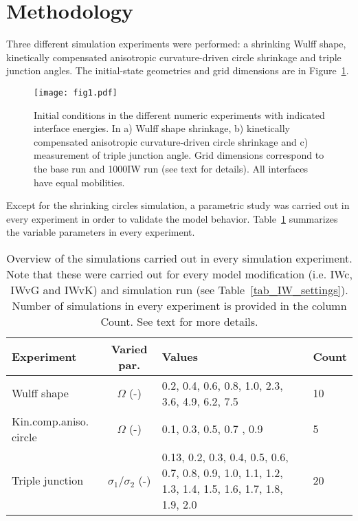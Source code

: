 \section{Methodology}
Three different simulation experiments were performed: a shrinking Wulff shape, kinetically compensated anisotropic curvature-driven circle shrinkage and triple junction angles. The initial-state geometries and grid dimensions are in Figure~\ref{fig_IC_sketch}. 
\label{sec_Numeric}
\begin{figure}[]
	\centering
	\texttt{[image: fig1.pdf]}
	\caption[PF model benchmarking, sketch - initial conditions in the different numeric experiments]{Initial conditions in the different numeric experiments with indicated interface energies. In a) Wulff shape shrinkage, b) kinetically compensated anisotropic curvature-driven circle shrinkage and c)  measurement of triple junction angle.  Grid dimensions correspond to the base run and 1000IW run (see text for details). All interfaces have equal mobilities.}
	\label{fig_IC_sketch}
\end{figure} 
Except for the shrinking circles simulation, a parametric study was carried out in every experiment in order to validate the model behavior. Table~\ref{tab_overview_simulations} summarizes the variable parameters in every experiment.
\begin{table}[]
	\centering
	\caption[PF model benchmarking - overview of the simulations carried out in every simulation experiment]{Overview of the simulations carried out in every simulation experiment. Note that these were carried out for every model modification (i.e. IWc, IWvG and IWvK) and simulation run (see Table~\ref{tab_IW_settings}). Number of simulations in every experiment is provided in the column Count. See text for more details.}
	\label{tab_overview_simulations}
	\begin{tabular}{lc|p{3.2cm}|l}
		\toprule
		Experiment          & Varied par.                   & Values                   & Count \\ \hline
		Wulff shape         & $\Omega$ (-)                  & 0.2, 0.4, 0.6, 0.8, 1.0, 2.3, 3.6, 4.9, 6.2, 7.5 & 10 \\ \hline
		Kin.comp.aniso. circle & $\Omega$ (-)                  & 0.1, 0.3, 0.5, 0.7 , 0.9       & 5 \\ \hline
		Triple junction     & $\sigma_1/\sigma_2$ (-)       & 0.13, 0.2, 0.3, 0.4, 0.5, 0.6, 0.7, 0.8, 0.9, 1.0, 1.1, 1.2, 1.3, 1.4, 1.5, 1.6, 1.7, 1.8, 1.9, 2.0  & 20 \\
		\bottomrule
	\end{tabular}
\end{table}

